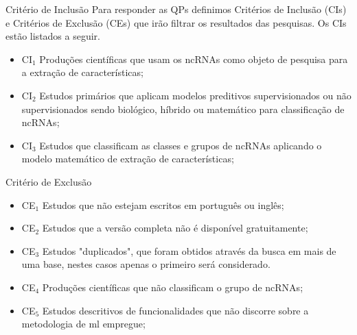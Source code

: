 \documentclass{apresentacao-ifb}
\begin{document}
\begin{frame}{Critério de Inclusão}
    Para responder as QPs definimos Critérios de Inclusão (CIs) e Critérios de Exclusão (CEs) que irão filtrar os resultados das pesquisas. Os CIs estão listados a seguir.

    \begin{itemize}
  \item CI$_{1}$ Produções científicas que usam os \ac{ncRNAs} como objeto de pesquisa para a extração de características;
  \item CI$_{2}$ Estudos primários que aplicam modelos preditivos supervisionados ou não supervisionados sendo biológico, híbrido ou matemático para classificação de \ac{ncRNAs};
  \item CI$_{3}$ Estudos que classificam as classes e grupos de ncRNAs aplicando o modelo matemático de extração de características;
    \end{itemize}
\end{frame}

\begin{frame}{Critério de Exclusão}
\begin{itemize}
    \item CE$_{1}$ Estudos que não estejam escritos em português ou inglês;
    \item CE$_{2}$ Estudos que a versão completa não é disponível gratuitamente;
    \item CE$_{3}$ Estudos "duplicados", que foram obtidos através da busca em mais de uma base, nestes casos apenas o primeiro será considerado.
    \item CE$_{4}$ Produções científicas que não classificam o grupo de \ac{ncRNAs};
    \item CE$_{5}$ Estudos descritivos de funcionalidades que não discorre sobre a metodologia de \ac{ml} empregue;
\end{itemize}
\end{frame}
\end{document}
